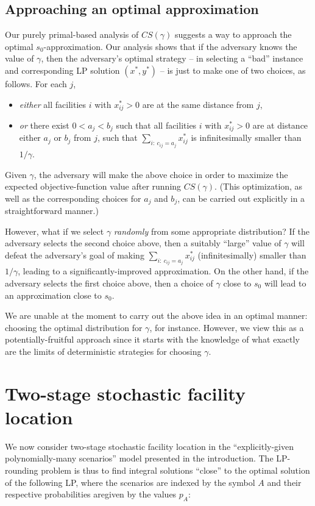 \documentclass[11pt]{article}
\begin{document}
\subsection{Approaching an optimal approximation}

Our purely primal-based analysis of $CS(\gamma)$ suggests a way to 
approach the optimal $s_0$-approximation. Our analysis shows that
if the adversary knows the value of $\gamma$, then the
adversary's optimal strategy -- in selecting a ``bad'' instance
and corresponding LP solution $(x^*, y^*)$ -- is just to make one
of two choices, as follows. For each $j$,
\begin{itemize}
\item \emph{either} all facilities $i$ with $x_{ij}^* > 0$ are at the
same distance from $j$,
\item \emph{or} there exist $0 < a_j < b_j$ such that all facilities $i$ 
with $x_{ij}^* > 0$ are at distance either $a_j$ or $b_j$ from $j$, 
such that $\sum_{i:~c_{ij} = a_j} x_{ij}^*$ is infinitesimally smaller
than $1/\gamma$.
\end{itemize}
Given $\gamma$, the adversary will make the above choice in order to
maximize the expected objective-function value after running $CS(\gamma)$.
(This optimization, as well as the corresponding choices for $a_j$ and $b_j$, 
can be carried out explicitly in a straightforward manner.) 

However, what  if we select $\gamma$ \emph{randomly} from some appropriate
distribution? If the adversary selects the second choice above, then a
suitably ``large'' value of $\gamma$ will defeat the adversary's goal of
making $\sum_{i:~c_{ij} = a_j} x_{ij}^*$ (infinitesimally) smaller
than $1/\gamma$, leading to a significantly-improved approximation. On
the other hand, if the adversary selects the first choice above, then 
a choice of $\gamma$ close to $s_0$ will lead to an approximation close
to $s_0$. 

We are unable at the moment to carry out the above idea in an optimal manner:
choosing the optimal distribution for $\gamma$, for instance. However, we view
this as a potentially-fruitful approach since it starts with the knowledge 
of what exactly are the limits of deterministic strategies for choosing 
$\gamma$.

\section{Two-stage stochastic facility location}
We now consider two-stage stochastic facility location in the
``explicitly-given polynomially-many scenarios'' model presented in the
introduction. The LP-rounding problem is thus to find 
integral solutions ``close'' to the optimal solution of the following LP, 
where the scenarios are indexed by the symbol $A$ and their respective
probabilities aregiven by the values $p_A$: 
\end{document}
